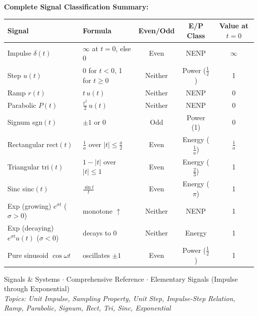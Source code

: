 \documentclass[10pt,a4paper]{article}
\begin{document}
\begin{propbox}
\textbf{Complete Signal Classification Summary:}

{\small
\begin{tabular}{@{}llccc@{}}
\toprule
\textbf{Signal} & \textbf{Formula} & \textbf{Even/Odd} & \textbf{E/P Class} & \textbf{Value at $t=0$}\\
\midrule
Impulse $\delta(t)$     & $\infty$ at $t=0$, else 0          & Even    & NENP        & $\infty$\\
Step $u(t)$             & 0 for $t<0$, 1 for $t\geq0$        & Neither & Power ($\frac{1}{2}$) & 1\\
Ramp $r(t)$             & $t\,u(t)$                           & Neither & NENP        & 0\\
Parabolic $P(t)$        & $\frac{t^2}{2}\,u(t)$               & Neither & NENP        & 0\\
Signum sgn$(t)$         & $\pm1$ or 0                         & Odd     & Power (1)   & 0\\
Rectangular rect$(t)$   & $\frac{1}{a}$ over $|t|\leq\frac{a}{2}$ & Even & Energy ($\frac{1}{a}$) & $\frac{1}{a}$\\
Triangular tri$(t)$     & $1-|t|$ over $|t|\leq1$             & Even    & Energy ($\frac{2}{3}$) & 1\\
Sinc sinc$(t)$          & $\frac{\sin t}{t}$                  & Even    & Energy ($\pi$) & 1\\
Exp (growing) $e^{\sigma t}$ ($\sigma>0$) & monotone $\uparrow$ & Neither & NENP & 1\\
Exp (decaying) $e^{\sigma t}u(t)$ ($\sigma<0$) & decays to 0  & Neither & Energy & 1\\
Pure sinusoid $\cos\omega t$ & oscillates $\pm1$               & Even    & Power ($\frac{1}{2}$) & 1\\
\bottomrule
\end{tabular}
}
\end{propbox}

\vspace{6pt}
\begin{center}
\small\color{gray}
Signals \& Systems $\cdot$ Comprehensive Reference $\cdot$ Elementary Signals (Impulse through Exponential)\\
\textit{Topics: Unit Impulse, Sampling Property, Unit Step, Impulse-Step Relation, Ramp, Parabolic, Signum, Rect, Tri, Sinc, Exponential}
\end{center}
\end{document}
